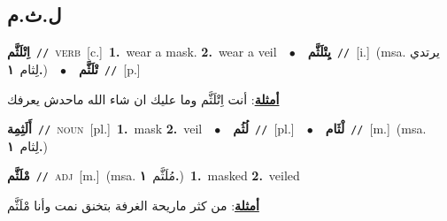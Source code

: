\documentclass[10pt,a4paper,twoside]{article} %
\begin{document}
\begin{multicols}{2}
{{{{{{{{{{{{{{{\vspace{-3mm}
\subsection*{\color{blue}\foreignlanguage{arabic}{ل.ث.م}\color{blue}{}} 

{\setlength\topsep{0pt}\textbf{\foreignlanguage{arabic}{اِتْلَثَّم}}\ {\color{gray}\texttt{//}\color{black}}\ \textsc{verb}\ [c.]\ \textbf{1.}~wear a mask.  \textbf{2.}~wear a veil\ \ $\bullet$\ \ \setlength\topsep{0pt}\textbf{\foreignlanguage{arabic}{يِتْلَثَّم}}\ {\color{gray}\texttt{//}\color{black}}\ [i.]\ \color{gray}(msa. \foreignlanguage{arabic}{يرتدي لِثام}~\foreignlanguage{arabic}{\textbf{١.}})\color{black}\ \ $\bullet$\ \ \setlength\topsep{0pt}\textbf{\foreignlanguage{arabic}{تْلَثَّم}}\ {\color{gray}\texttt{//}\color{black}}\ [p.]\  \begin{flushright}\color{gray}\foreignlanguage{arabic}{\textbf{\underline{\foreignlanguage{arabic}{أمثلة}}}: أنت اِتْلَثَّم وما عليك ان شاء الله ماحدش يعرفك}\end{flushright}\color{black}} \vspace{2mm}

{\setlength\topsep{0pt}\textbf{\foreignlanguage{arabic}{أَلَثِمِة}}\ {\color{gray}\texttt{//}\color{black}}\ \textsc{noun}\ [pl.]\ \textbf{1.}~mask  \textbf{2.}~veil\ \ $\bullet$\ \ \setlength\topsep{0pt}\textbf{\foreignlanguage{arabic}{لُثُم}}\ {\color{gray}\texttt{//}\color{black}}\ [pl.]\ \ $\bullet$\ \ \setlength\topsep{0pt}\textbf{\foreignlanguage{arabic}{لْثَام}}\ {\color{gray}\texttt{//}\color{black}}\ [m.]\ \color{gray}(msa. \foreignlanguage{arabic}{لِثام}~\foreignlanguage{arabic}{\textbf{١.}})\color{black}\ 

{\setlength\topsep{0pt}\textbf{\foreignlanguage{arabic}{مْلَثَّم}}\ {\color{gray}\texttt{//}\color{black}}\ \textsc{adj}\ [m.]\ \color{gray}(msa. \foreignlanguage{arabic}{مُلَثَّم}~\foreignlanguage{arabic}{\textbf{١.}})\color{black}\ \textbf{1.}~masked  \textbf{2.}~veiled\  \begin{flushright}\color{gray}\foreignlanguage{arabic}{\textbf{\underline{\foreignlanguage{arabic}{أمثلة}}}: من كثر ماريحة الغرفة بتخنق نمت وأنا مْلَثَّم}\end{flushright}\color{black}} \vspace{2mm}

}}}}}}}}}}}}}}}}
\end{multicols}
\end{document}
